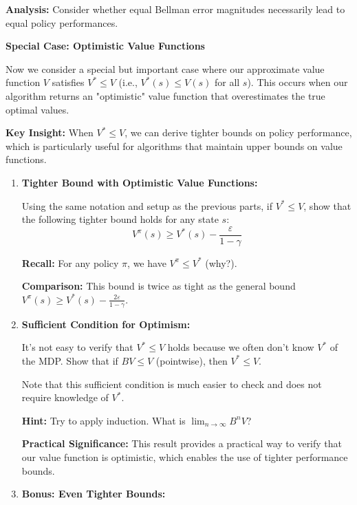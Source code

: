 \documentclass[12pt]{article}
\begin{document}
{{\begin{enumerate}[resume*]
    \textbf{Analysis:} Consider whether equal Bellman error magnitudes necessarily lead to equal policy performances.
 \end{enumerate}
\textbf{Special Case: Optimistic Value Functions}

Now we consider a special but important case where our approximate value function \( V \) satisfies \( V^{*} \leq V \) (i.e., \( V^{*}(s) \leq V(s) \) for all \( s \)). This occurs when our algorithm returns an "optimistic" value function that overestimates the true optimal values.

\textbf{Key Insight:} When \( V^{*} \leq V \), we can derive tighter bounds on policy performance, which is particularly useful for algorithms that maintain upper bounds on value functions.

\begin{enumerate}[resume*]
    \item \textbf{Tighter Bound with Optimistic Value Functions:}
    
    Using the same notation and setup as the previous parts, if \( V^{*} \leq V \), show that the following tighter bound holds for any state \( s \):
    \[
    V^{\pi}(s) \geq V^{*}(s) - \frac{\varepsilon}{1 - \gamma}
    \]
    
    \textbf{Recall:} For any policy \( \pi \), we have \( V^{\pi} \leq V^{*} \) (why?).
    
    \textbf{Comparison:} This bound is twice as tight as the general bound \( V^{\pi}(s) \geq V^{*}(s) - \frac{2\varepsilon}{1 - \gamma} \).

    \item \textbf{Sufficient Condition for Optimism:}
    
    It's not easy to verify that \( V^{*} \leq V \) holds because we often don't know \( V^{*} \) of the MDP. Show that if \( BV \leq V \) (pointwise), then \( V^{*} \leq V \).
    
    Note that this sufficient condition is much easier to check and does not require knowledge of \( V^{*} \).
    
    \textbf{Hint:} Try to apply induction. What is \( \lim_{n \to \infty} B^nV \)?
    
    \textbf{Practical Significance:} This result provides a practical way to verify that our value function is optimistic, which enables the use of tighter performance bounds.

    \item \textbf{Bonus: Even Tighter Bounds:}
    

\end{enumerate}}}
\end{document}
